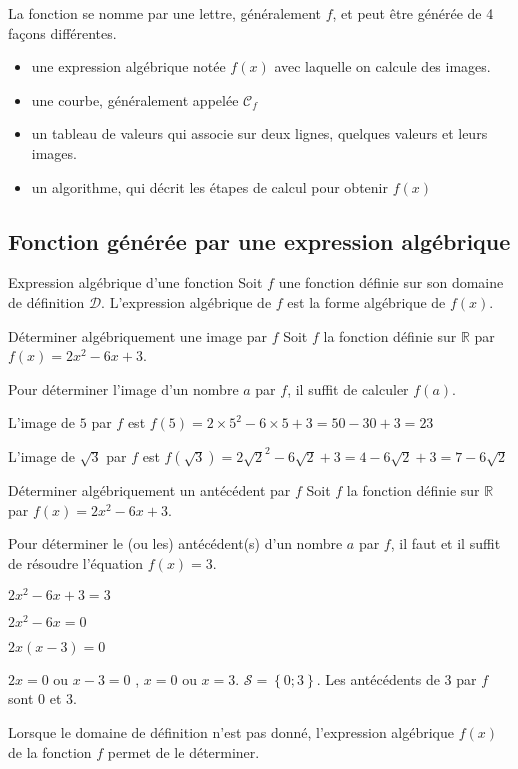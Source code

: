 \begin{pageCours}
\begin{Rqs}
La fonction se nomme par une lettre, généralement $f$, et peut être générée de 4 façons différentes.
\begin{itemize}
\item une expression algébrique notée $f(x)$ avec laquelle on calcule des images.
 \item une courbe, généralement appelée $\mathcal C_{f}$
\item un tableau de valeurs qui associe sur deux lignes, quelques valeurs et leurs images.
\item un algorithme, qui décrit les étapes de calcul pour obtenir $f(x)$
 \end{itemize}
 
\end{Rqs}
 
 
\subsection{Fonction générée par une expression algébrique}
 
\begin{DefT}{Expression algébrique d'une fonction}
Soit $f$ une fonction définie sur son domaine de définition $\mathcal D$.
L'expression algébrique de $f$ est la forme algébrique de $f(x)$.
\end{DefT}
 

\begin{MtT}{Déterminer algébriquement une image  par $f$}
Soit $f$ la fonction définie sur $\mathbb R$ par $f(x)= 2x^2 - 6x + 3$.

Pour déterminer l'image d'un nombre $a$ par $f$, il suffit de calculer $f(a)$.

L'image de $5$ par $f$ est $f(5)= 2\times 5^2 - 6\times 5 + 3 = 50-30+3 = 23$

L'image de $\sqrt{3}$ par $f$ est $f(\sqrt{3})= 2  \sqrt{2}^2 - 6  \sqrt{2} + 3 = 4-6\sqrt{2}+3 = 7-6\sqrt{2}$
\end{MtT}



\begin{MtT}{Déterminer algébriquement un antécédent par $f$}
Soit $f$ la fonction définie sur $\mathbb R$ par $f(x)= 2x^2 - 6x + 3$.

Pour déterminer le (ou les) antécédent(s) d'un nombre $a$ par $f$, il faut et il suffit de résoudre l'équation $f(x) = 3$.

$2x^2 - 6x + 3 = 3$

$2x^2 - 6x = 0$

$2x (x - 3) = 0$

$2x = 0$ ou $x - 3 = 0$ , $x = 0$ ou  $x = 3$. $\mathscr{S}=\left\lbrace 0;3\right\rbrace $. Les antécédents de 3 par $f$ sont 0 et 3.

\end{MtT}



\begin{Rq} 
Lorsque le domaine de définition n'est pas donné, l'expression algébrique $f(x)$ de la fonction $f$ permet de le déterminer.
\end{Rq} 


\end{pageCours}


